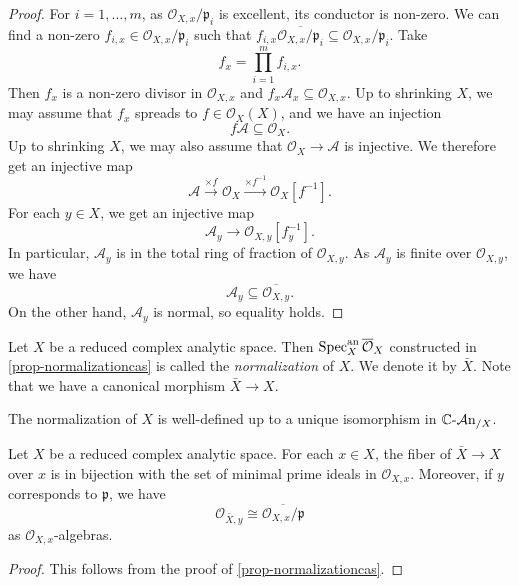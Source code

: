 \begin{proof}
    For $i=1,\ldots,m$, as $\mathcal{O}_{X,x}/\mathfrak{p}_i$ is excellent, its conductor is non-zero. We can find a non-zero $f_{i,x}\in \mathcal{O}_{X,x}/\mathfrak{p}_i$ such that $f_{i,x}\overline{\mathcal{O}_{X,x}/\mathfrak{p}_i}\subseteq \mathcal{O}_{X,x}/\mathfrak{p}_i$. Take 
    \[
        f_x=\prod_{i=1}^m f_{i,x}.  
    \]
    Then $f_x$ is a non-zero divisor in $\mathcal{O}_{X,x}$ and $f_x \mathcal{A}_x\subseteq \mathcal{O}_{X,x}$. Up to shrinking $X$, we may assume that $f_x$ spreads to $f\in \mathcal{O}_X(X)$, and we have an injection
    \[
        f\mathcal{A}\subseteq \mathcal{O}_X.  
    \]
    Up to shrinking $X$, we may also assume that $\mathcal{O}_X\rightarrow \mathcal{A}$ is injective. We therefore get an injective map
    \[
        \mathcal{A}\xrightarrow{\times f} \mathcal{O}_X  \xrightarrow{\times f^{-1}}\mathcal{O}_X[f^{-1}]. 
    \]
    For each $y\in X$, we get an injective map
    \[
        \mathcal{A}_y\rightarrow \mathcal{O}_{X,y}[f_y^{-1}].  
    \]
    In particular, $\mathcal{A}_y$ is in the total ring of fraction of $\mathcal{O}_{X,y}$. As $\mathcal{A}_y$ is finite over $\mathcal{O}_{X,y}$, we have
    \[
        \mathcal{A}_y\subseteq \overline{\mathcal{O}_{X,y}}.
    \]
    On the other hand, $\mathcal{A}_y$ is normal, so equality holds. 
\end{proof}

\begin{definition}
    Let $X$ be a reduced complex analytic space. Then $\operatorname{Spec}^{\mathrm{an}}_X \overline{\mathcal{O}}_X$ constructed in \cref{prop-normalizationcas} is called the \emph{normalization} of $X$. We denote it by $\bar{X}$.
    Note that we have a canonical morphism $\bar{X}\rightarrow X$. 
    
    The normalization of $X$ is well-defined up to a unique isomorphism in $\mathbb{C}\text{-}\mathcal{A}\mathrm{n}_{/X}$.
\end{definition}



\begin{proposition}\label{prop-normalizationbranches}
    Let $X$ be a reduced complex analytic space. For each $x\in X$, the fiber of $\bar{X}\rightarrow X$ over $x$ is in bijection with the set of minimal prime ideals in $\mathcal{O}_{X,x}$. Moreover, if $y$ corresponds to $\mathfrak{p}$, we have
    \[
      \mathcal{O}_{\bar{X},y}\cong  \overline{\mathcal{O}_{X,x}/\mathfrak{p}}
    \] 
    as $\mathcal{O}_{X,x}$-algebras.
\end{proposition}
\begin{proof}
    This follows from the proof of \cref{prop-normalizationcas}.   
\end{proof}



